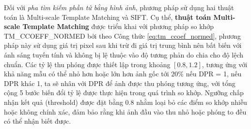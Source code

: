 \documentclass[a4paper, 12pt]{report}
\begin{document}
{%


Đối với \textit{pha tìm kiếm phần tử bằng hình ảnh}, phương pháp sử dụng hai thuật toán là Multi-scale Template Matching và SIFT. Cụ thể, \textbf{thuật toán Multi-scale Template Matching} được triển khai với phương pháp so khớp TM\_CCOEFF\_NORMED bởi theo Công thức \ref{eq:tm_ccoef_normed}, phương pháp này sử dụng giá trị pixel sau khi trừ đi giá trị trung bình nên bất biến với ánh sáng tuyến tính và không bị lệ thuộc vào độ tương phản do chia cho độ lệch chuẩn. Các tỷ lệ thu phóng được thiết lập trong khoảng $[0.8, 1.2]$, tương ứng với khả năng mẫu có thể nhỏ hơn hoặc lớn hơn ảnh gốc tới $20\%$ nếu DPR = 1, nếu DPR khác 1, ta sẽ nhân với DPR để ảnh được thu phóng tương ứng, với tổng cộng 5 bước biến đổi tỷ lệ được thực hiện trong quá trình so khớp. Ngưỡng chấp nhận kết quả (threshold) được đặt bằng 0.8 nhằm loại bỏ các điểm so khớp nhiễu hoặc không chính xác, đảm bảo rằng khi ảnh đầu vào thu nhỏ hoặc phóng to đều có thể nhận biết được. 

}
\end{document}
